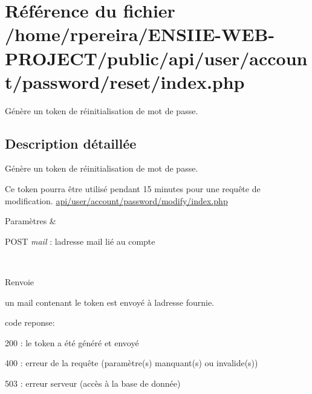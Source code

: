 \hypertarget{account_2password_2reset_2index_8php}{}\section{Référence du fichier /home/rpereira/\+E\+N\+S\+I\+I\+E-\/\+W\+E\+B-\/\+P\+R\+O\+J\+E\+C\+T/public/api/user/account/password/reset/index.php}
\label{account_2password_2reset_2index_8php}


Génère un token de réinitialisation de mot de passe.  




\subsection{Description détaillée}
Génère un token de réinitialisation de mot de passe. 

Ce token pourra être utilisé pendant 15 minutes pour une requête de modification. \hyperlink{account_2password_2modify_2index_8php}{api/user/account/password/modify/index.\+php} 
\begin{DoxyParams}{Paramètres}
{\em } & 
\begin{DoxyItemize}
\item P\+O\+ST {\itshape mail} \+: l\textquotesingle{}adresse mail lié au compte 
\end{DoxyItemize}\\
\hline
\end{DoxyParams}
\begin{DoxyReturn}{Renvoie}

\begin{DoxyItemize}
\item un mail contenant le token est envoyé à l\textquotesingle{}adresse fournie.
\item code reponse\+:
\begin{DoxyItemize}
\item 200 \+: le token a été généré et envoyé
\item 400 \+: erreur de la requête (paramètre(s) manquant(s) ou invalide(s))
\item 503 \+: erreur serveur (accès à la base de donnée) 
\end{DoxyItemize}
\end{DoxyItemize}
\end{DoxyReturn}
